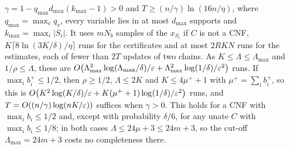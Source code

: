 \begin{theorem}
$\gamma=1-q_{\max}d_{\max}(k_{\max}-1)>0$ and $T\ge(n/\gamma)\ln(16n/\eta)$, where
$q_{\max}=\max_vq_v$, every variable lies in at most $d_{\max}$ supports and
$k_{\max}=\max_i|S_i|$. It uses $mN_b$ samples of the $x_{S_i}$ if $C$ is not a CNF,
$K\lceil8\ln(3K/\delta)/\eta\rceil$ runs for the certificates and at most $2RKN$ runs
for the estimates, each of fewer than $2T$ updates of two chains. As
$K\le\Lambda\le\Lambda_{\max}$ and $1/\rho\le\Lambda$, these are
$O\big(\Lambda_{\max}^3\log(\Lambda_{\max}/\delta)/\varepsilon+\Lambda_{\max}^2\log(1/\delta)/\varepsilon^2\big)$
runs. If $\max_ib_i^+\le1/2$, then $\rho\ge1/2$, $\Lambda\le2K$ and $K\le4\mu^++1$ with
$\mu^+=\sum_ib_i^+$, so this is
$O\big(K^2\log(K/\delta)/\varepsilon+K(\mu^++1)\log(1/\delta)/\varepsilon^2\big)$ runs, and
$T=O((n/\gamma)\log(nK/\varepsilon))$ suffices when $\gamma>0$. This holds for a CNF with
$\max_ib_i\le1/2$ and, except with probability $\delta/6$, for any unate $C$ with
$\max_ib_i\le1/8$; in both cases $\Lambda\le24\mu+3\le24m+3$, so the cut-off
$\Lambda_{\max}=24m+3$ costs no completeness there.
\end{theorem}

